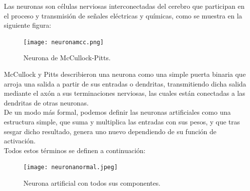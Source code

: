 \documentclass[a4paper,11pt]{article}
\begin{document}
\noindent
 Las neuronas son células nerviosas interconectadas del cerebro que participan en el proceso y transmisión de señales eléctricas y químicas, como se muestra en la siguiente figura: \\

\begin{figure}[H]
\centering
\texttt{[image: neuronamcc.png]}
\caption{Neurona de McCullock-Pitts.}
\end{figure}
\noindent
McCullock y Pitts describieron una neurona como una simple puerta binaria que arroja una salida a partir de sus entradas o dendritas, transmitiendo dicha salida mediante el axón a sus terminaciones nerviosas, las cuales están conectadas a las dendritas de otras neuronas.\\

\noindent
De un modo más formal, podemos definir las neuronas artificiales como una estructura simple, que suma y multiplica las entradas con sus pesos, y que tras sesgar dicho resultado, genera uno nuevo dependiendo de su función de activación. \\

\noindent
Todos estos términos se definen a continuación:
\begin{figure}[H]
\centering
\texttt{[image: neuronanormal.jpeg]}
\caption{Neurona artificial con todos sus componentes.}
\end{figure}
\end{document}
